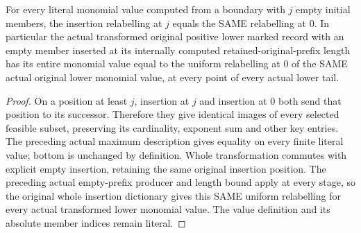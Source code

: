 \begin{lemma}
\label{hir:member-future-shift}
\leanok
For every literal monomial value computed from a boundary with $j$ empty initial members, the insertion relabelling at $j$ equals the SAME relabelling at $0$. In particular the actual transformed original positive lower marked record with an empty member inserted at its internally computed retained-original-prefix length has its entire monomial value equal to the uniform relabelling at $0$ of the SAME actual original lower monomial value, at every point of every actual lower tail.
\end{lemma}
\begin{proof}
On a position at least $j$, insertion at $j$ and insertion at $0$ both send that position to its successor. Therefore they give identical images of every selected feasible subset, preserving its cardinality, exponent sum and other key entries. The preceding actual maximum description gives equality on every finite literal value; bottom is unchanged by definition. Whole transformation commutes with explicit empty insertion, retaining the same original insertion position. The preceding actual empty-prefix producer and length bound apply at every stage, so the original whole insertion dictionary gives this SAME uniform relabelling for every actual transformed lower monomial value. The value definition and its absolute member indices remain literal.
\end{proof}

